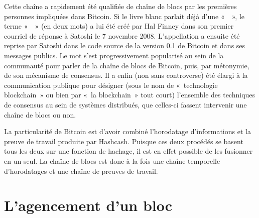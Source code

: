 Cette chaîne a rapidement été qualifiée de chaîne de blocs par les premières personnes impliquées dans Bitcoin. Si le livre blanc parlait déjà d'une «~~», le terme «~~» (en deux mots) a lui été créé par Hal Finney dans son premier courriel de réponse à Satoshi le 7 novembre 2008. L'appellation a ensuite été reprise par Satoshi dans le code source de la version 0.1 de Bitcoin et dans ses messages publics. Le mot  s'est progressivement popularisé au sein de la communauté pour parler de la chaîne de blocs de Bitcoin, puis, par métonymie, de son mécanisme de consensus. Il a enfin (non sans controverse) été élargi à la communication publique pour désigner (sous le nom de «~technologie blockchain~» ou bien par «~la blockchain~» tout court) l'ensemble des techniques de consensus au sein de systèmes distribués, que celles-ci fassent intervenir une chaîne de blocs ou non.

La particularité de Bitcoin est d'avoir combiné l'horodatage d'informations et la preuve de travail produite par Hashcash. Puisque ces deux procédés se basent tous les deux sur une fonction de hachage, il est en effet possible de les fusionner en un seul. La chaîne de blocs est donc à la fois une chaîne temporelle d'horodatages et une chaîne de preuves de travail.

\section*{L'agencement d'un bloc} %


